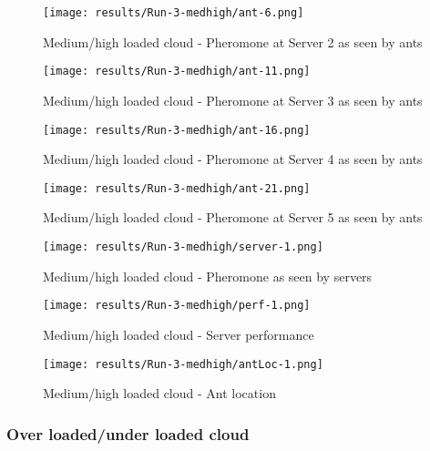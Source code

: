 \begin{figure}
	\centering
		\texttt{[image: results/Run-3-medhigh/ant-6.png]}
	\caption{Medium/high loaded cloud - Pheromone at Server 2 as seen by ants}
	\label{fig:3serv-ant6-medhigh}
\end{figure}

\begin{figure}
	\centering
		\texttt{[image: results/Run-3-medhigh/ant-11.png]}
	\caption{Medium/high loaded cloud - Pheromone at Server 3 as seen by ants}
	\label{fig:3serv-ant11-medhigh}
\end{figure}

\begin{figure}
	\centering
		\texttt{[image: results/Run-3-medhigh/ant-16.png]}
	\caption{Medium/high loaded cloud - Pheromone at Server 4 as seen by ants}
	\label{fig:3serv-ant16-medhigh}
\end{figure}

\begin{figure}
	\centering
		\texttt{[image: results/Run-3-medhigh/ant-21.png]}
	\caption{Medium/high loaded cloud - Pheromone at Server 5 as seen by ants}
	\label{fig:3serv-ant25-medhigh}
\end{figure}

\begin{figure}
	\centering
		\texttt{[image: results/Run-3-medhigh/server-1.png]}
	\caption{Medium/high loaded cloud - Pheromone as seen by servers}
	\label{fig:3serv-pher-medhigh}
\end{figure}

\begin{figure}
	\centering
		\texttt{[image: results/Run-3-medhigh/perf-1.png]}
	\caption{Medium/high loaded cloud - Server performance}
	\label{fig:3serv-perf-medhigh}
\end{figure}

\begin{figure}
	\centering
		\texttt{[image: results/Run-3-medhigh/antLoc-1.png]}
	\caption{Medium/high loaded cloud - Ant location}
	\label{fig:3serv-antloc-medhigh}
\end{figure}

\subsubsection{Over loaded/under loaded cloud}

